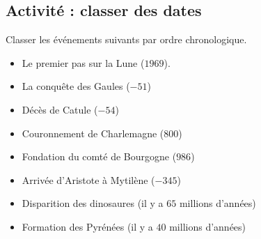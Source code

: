 
\subsection*{Activité : classer des dates}

Classer les événements suivants par ordre chronologique.
\begin{itemize}
    \item Le premier pas sur la Lune (\( 1969\)).
    \item La conquête des Gaules (\( -51\))
    \item Décès de Catule (\( -54\))
    \item Couronnement de Charlemagne (\( 800\))
    \item Fondation du comté de Bourgogne (\( 986\))
    \item Arrivée d'Aristote à Mytilène (\( -345\))
    \item Disparition des dinosaures (il y a \( 65\) millions d'années)
    \item Formation des Pyrénées (il y a \( 40\) millions d'années)
\end{itemize}
